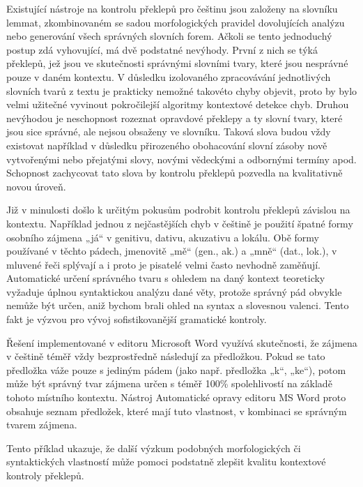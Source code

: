 \begin{multicols}{2}
Existující nástroje na kontrolu překlepů pro češtinu jsou založeny na slovníku lemmat, zkombinovaném se sadou morfologických pravidel dovolujících analýzu nebo generování všech správných slovních forem. Ačkoli se tento jednoduchý postup zdá vyhovující, má dvě podstatné nevýhody. První z nich se týká překlepů, jež jsou ve skutečnosti správnými slovními tvary, které jsou nesprávné pouze v daném kontextu. V důsledku izolovaného zpracovávání jednotlivých slovních tvarů z textu je prakticky nemožné takovéto chyby objevit, proto by bylo velmi užitečné vyvinout pokročilejší algoritmy kontextové detekce chyb. Druhou nevýhodou je neschopnost rozeznat opravdové překlepy a ty slovní tvary, které jsou sice správné, ale nejsou obsaženy ve slovníku. Taková slova budou vždy existovat například v důsledku přirozeného obohacování slovní zásoby nově vytvořenými nebo přejatými slovy, novými vědeckými a odbornými termíny apod. Schopnost zachycovat tato slova by kontrolu překlepů pozvedla na kvalitativně novou úroveň.

Již v minulosti došlo k určitým pokusům podrobit kontrolu překlepů závislou na kontextu. Například jednou z nejčastějších chyb v češtině je použití špatné formy osobního zájmena „já“ v genitivu, dativu, akuzativu a lokálu. Obě formy používané v těchto pádech, jmenovitě „mě“ (gen., ak.) a „mně“ (dat., lok.), v mluvené řeči splývají a i proto je pisatelé velmi často nevhodně zaměňují. Automatické určení správného tvaru s ohledem na daný kontext teoreticky vyžaduje úplnou syntaktickou analýzu dané věty, protože správný pád obvykle nemůže být určen, aniž bychom brali ohled na syntax a slovesnou valenci. Tento fakt je výzvou pro vývoj sofistikovanější gramatické kontroly.

Řešení implementované v editoru Microsoft Word využívá skutečnosti, že zájmena v češtině téměř vždy bezprostředně následují za předložkou. Pokud se tato předložka váže pouze s jediným pádem (jako např. předložka „k“, „ke“), potom může být správný tvar zájmena určen s téměř 100\% spolehlivostí na základě tohoto místního kontextu. Nástroj Automatické opravy editoru MS Word proto obsahuje seznam předložek, které mají tuto vlastnost, v kombinaci se správným tvarem zájmena.

Tento příklad ukazuje, že další výzkum podobných morfologických či syntaktických vlastností může pomoci podstatně zlepšit kvalitu kontextové kontroly překlepů.


\end{multicols}
